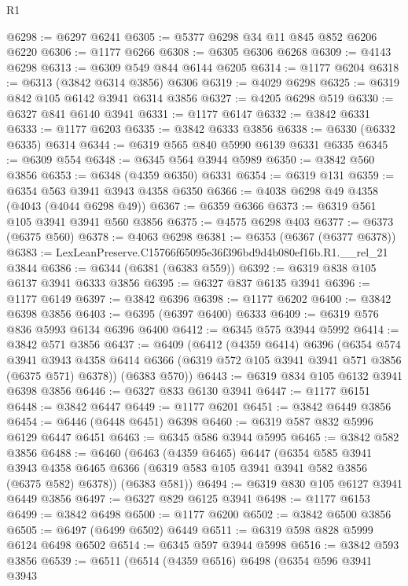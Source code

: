 \begin{lexlean}{R1}
\begin{coremodule}
@6298 := @6297 @6241
@6305 := @5377 @6298 @34 @11 @845 @852 @6206 @6220
@6306 := @1177 @6266
@6308 := @6305 @6306 @6268
@6309 := @4143 @6298
@6313 := @6309 @549 @844 @6144 @6205
@6314 := @1177 @6204
@6318 := @6313 (@3842 @6314 @3856) @6306
@6319 := @4029 @6298
@6325 := @6319 @842 @105 @6142 @3941 @6314 @3856
@6327 := @4205 @6298 @519
@6330 := @6327 @841 @6140 @3941
@6331 := @1177 @6147
@6332 := @3842 @6331
@6333 := @1177 @6203
@6335 := @3842 @6333 @3856
@6338 := @6330 (@6332 @6335) @6314
@6344 := @6319 @565 @840 @5990 @6139 @6331 @6335
@6345 := @6309 @554
@6348 := @6345 @564 @3944 @5989
@6350 := @3842 @560 @3856
@6353 := @6348 (@4359 @6350) @6331
@6354 := @6319 @131
@6359 := @6354 @563 @3941 @3943 @4358 @6350
@6366 := @4038 @6298 @49 @4358 (@4043 (@4044 @6298 @49))
@6367 := @6359 @6366
@6373 := @6319 @561 @105 @3941 @3941 @560 @3856
@6375 := @4575 @6298 @403
@6377 := @6373 (@6375 @560)
@6378 := @4063 @6298
@6381 := @6353 (@6367 (@6377 @6378))
@6383 := LexLeanPreserve.C15766f65095e36f396bd9d4b080ef16b.R1.__rel_21 @3844
@6386 := @6344 (@6381 (@6383 @559))
@6392 := @6319 @838 @105 @6137 @3941 @6333 @3856
@6395 := @6327 @837 @6135 @3941
@6396 := @1177 @6149
@6397 := @3842 @6396
@6398 := @1177 @6202
@6400 := @3842 @6398 @3856
@6403 := @6395 (@6397 @6400) @6333
@6409 := @6319 @576 @836 @5993 @6134 @6396 @6400
@6412 := @6345 @575 @3944 @5992
@6414 := @3842 @571 @3856
@6437 := @6409
    (@6412
      (@4359 @6414)
      @6396
      (@6354
        @574
        @3941
        @3943
        @4358
        @6414
        @6366
        (@6319 @572 @105 @3941 @3941 @571 @3856 (@6375 @571) @6378))
      (@6383 @570))
@6443 := @6319 @834 @105 @6132 @3941 @6398 @3856
@6446 := @6327 @833 @6130 @3941
@6447 := @1177 @6151
@6448 := @3842 @6447
@6449 := @1177 @6201
@6451 := @3842 @6449 @3856
@6454 := @6446 (@6448 @6451) @6398
@6460 := @6319 @587 @832 @5996 @6129 @6447 @6451
@6463 := @6345 @586 @3944 @5995
@6465 := @3842 @582 @3856
@6488 := @6460
    (@6463
      (@4359 @6465)
      @6447
      (@6354
        @585
        @3941
        @3943
        @4358
        @6465
        @6366
        (@6319 @583 @105 @3941 @3941 @582 @3856 (@6375 @582) @6378))
      (@6383 @581))
@6494 := @6319 @830 @105 @6127 @3941 @6449 @3856
@6497 := @6327 @829 @6125 @3941
@6498 := @1177 @6153
@6499 := @3842 @6498
@6500 := @1177 @6200
@6502 := @3842 @6500 @3856
@6505 := @6497 (@6499 @6502) @6449
@6511 := @6319 @598 @828 @5999 @6124 @6498 @6502
@6514 := @6345 @597 @3944 @5998
@6516 := @3842 @593 @3856
@6539 := @6511
    (@6514
      (@4359 @6516)
      @6498
      (@6354
        @596
        @3941
        @3943

\end{coremodule}
\end{lexlean}
